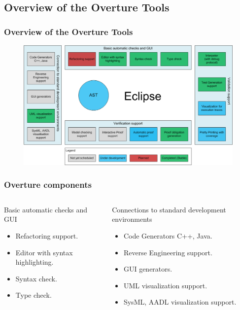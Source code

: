 \documentclass[slidestop,uncompress,mathserif,notes]{beamer}
\begin{document}
\subsection{Overview of the Overture Tools}
\frame
{
  \frametitle{Overview of the Overture Tools}

\begin{figure}[t]
\centering
\includegraphics[width=\textwidth]{images/OvertureOverview}
\label{fig:}
\end{figure}

}

\begin{frame}
	\frametitle{Overture components}
	\begin{columns}
			\begin{block}{Basic automatic checks and GUI}
				{\scriptsize\begin{itemize}
				  \item Refactoring support.
				  \item Editor with syntax highlighting.
				  \item Syntax check.      
				  \item Type check.
				\end{itemize}}
			\end{block}
			\begin{block}{Connections to standard development environments}
				{\scriptsize\begin{itemize}
			  \item Code Generators C++, Java.
			  \item Reverse Engineering support.
			  \item GUI generators.      
			  \item UML visualization support.
			  \item SysML, AADL visualization support.
				\end{itemize}}
			\end{block}
		\end{columns}
\end{frame}
\end{document}

